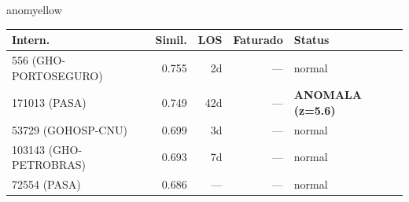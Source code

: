 \documentclass[a4paper,10pt]{article}
\begin{document}
\begin{anomalycard}[Internacao 165095 | GHO-PETROBRAS | MODERADO (z=2.17)]{anomyellow}
\begin{tabular}{l r r r l}\toprule\textbf{Intern.} & \textbf{Simil.} & \textbf{LOS} & \textbf{Faturado} & \textbf{Status} \\\midrule
556 (GHO-PORTOSEGURO) & 0.755 & 2d & --- & \textcolor{jcubeblue}{normal} \\
171013 (PASA) & 0.749 & 42d & --- & \textcolor{anomred}{\textbf{ANOMALA (z=5.6)}} \\
53729 (GOHOSP-CNU) & 0.699 & 3d & --- & \textcolor{jcubeblue}{normal} \\
103143 (GHO-PETROBRAS) & 0.693 & 7d & --- & \textcolor{jcubeblue}{normal} \\
72554 (PASA) & 0.686 & --- & --- & \textcolor{jcubeblue}{normal} \\
\bottomrule\end{tabular}



\end{anomalycard}

\newpage
\end{document}
